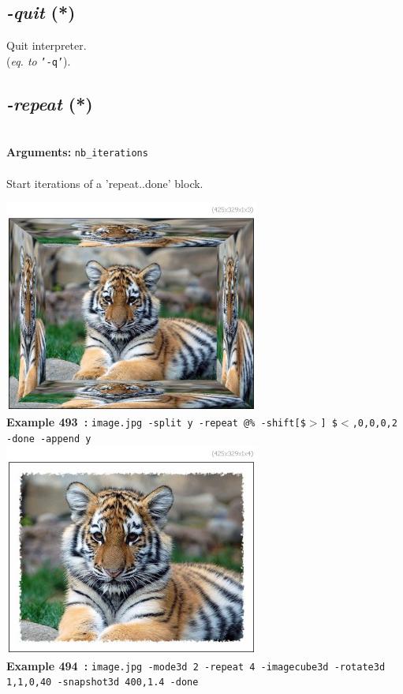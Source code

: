 \documentclass[a4paper,11pt,twoside]{book}
\begin{document}
\subsection{\emph{-quit} (*)}\vspace*{-0.5em}
Quit interpreter.
~\\(\emph{eq. to} {\small \texttt{'-q'}}).


\subsection{\emph{-repeat} (*)}\vspace*{-0.5em}
~\\\textbf{Arguments: } 
{\small \texttt{nb\_iterations}}\\~\\
Start iterations of a 'repeat..done' block.
\begin{center}\includegraphics[keepaspectratio=true,height=7cm,width=\textwidth]{img/gmic_def493.jpg}\\
{\footnotesize \textbf{Example 493~:} \texttt{image.jpg -split y -repeat @\% -shift[\$$>$] \$$<$,0,0,0,2 -done -append y}}
\\\includegraphics[keepaspectratio=true,height=7cm,width=\textwidth]{img/gmic_def494.jpg}\\
{\footnotesize \textbf{Example 494~:} \texttt{image.jpg -mode3d 2 -repeat 4 -imagecube3d -rotate3d 1,1,0,40 -snapshot3d 400,1.4 -done}}
\end{center}
\end{document}
